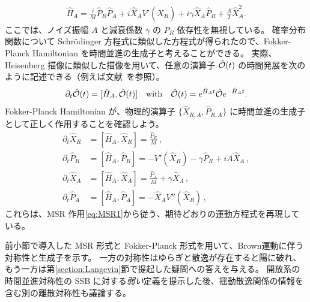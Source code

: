 \begin{equation}
 \begin{split}
  \hat{H}_A 
  = \frac{i}{M} \hat{P}_R \hat{P}_A  
  + i \hat{X}_A V'(\hat{X}_R) 
  + i\gamma \hat{X}_A \hat{P}_R
  + \frac{A}{2} \hat{X}_A^2.
 \end{split}
 \label{eq:FP2}
\end{equation}
ここでは、ノイズ振幅 $A$ と減衰係数 $\gamma$ の $P_R$ 依存性を無視している。
確率分布関数について Schr\"odinger 方程式に類似した方程式が得られたので、Fokker-Planck Hamiltonian を時間並進の生成子と考えることができる。
実際、Heisenberg 描像に類似した描像を用いて、任意の演算子 ${\hat{\mathcal{O}}} (t)$ の時間発展を次のように記述できる（例えば文献~\cite{Zinn1996quantum}を参照）。
\begin{equation}
 \partial_t {\hat{\mathcal{O}}} (t) = [\hat{H}_A, {\hat{\mathcal{O}}} (t)]
  {\quad\mathrm{with}}\quad
  {\hat{\mathcal{O}}} (t) = e^{ \hat{H}_A t } {\hat{\mathcal{O}}} e^{- \hat{H}_A t}.
  \label{eq:EoMinFP}
\end{equation}
Fokker-Planck Hamiltonian が、物理的演算子 $\{\hat{X}_{R,A}, \hat{P}_{R,A}\}$ に時間並進の生成子として正しく作用することを確認しよう。
\begin{align}
 \partial_t \hat{X}_R &= [\hat{H}_A, \hat{X}_R] = \frac{\hat{P}_R}{M} 
 \,\label{HPtrsf:1},
 \\
 \partial_t \hat{P}_R &= [\hat{H}_A, \hat{P}_R] 
 = -V'(\hat{X}_R) - \gamma \hat{P}_R + iA \hat{X}_A \,, 
 \\ 
 \partial_t \hat{X}_A &= [\hat{H}_A, \hat{X}_A] 
 = \frac{\hat{P}_A}{M} + \gamma \hat{X}_A\,,
 \\
 \partial_t \hat{P}_A &= [\hat{H}_A, \hat{P}_A] 
 = - \hat{X}_A  V''(\hat{X}_R) \,\label{HPtrsf:4},
\end{align}
これらは、MSR 作用\eqref{eq:MSR1}から従う、期待どおりの運動方程式を再現している。


\label{section:BrownianSymmetries}

前小節で導入した MSR 形式と Fokker-Planck 形式を用いて、Brown運動に伴う対称性と生成子を示す。
一方の対称性はゆらぎと散逸が存在すると陽に破れ、もう一方は第\ref{section:Langevin}節で提起した疑問への答えを与える。
開放系の時間並進対称性の SSB に対する\textit{弱い}定義を提示した後、揺動散逸関係の情報を含む別の離散対称性も議論する。


